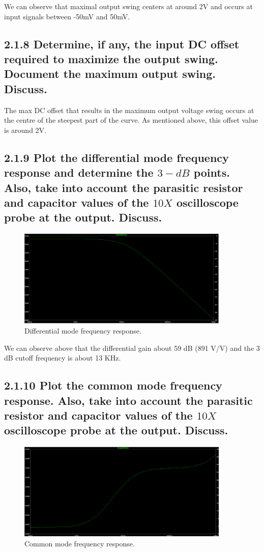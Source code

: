 \documentclass[12pt]{article}
\begin{document}
We can observe that maximal output swing centers at around 2V and occurs at input signals between -50mV and 50mV.

\subsection*{2.1.8 Determine, if any, the input DC offset required to maximize the output swing. Document the maximum output swing. Discuss.}

The max DC offset that results in the maximum output voltage swing occurs at the centre of the steepest part of the curve. As mentioned above, this offset value is around 2V.

\subsection*{2.1.9 Plot the differential mode frequency response and determine the $3-dB$ points. Also, take into account the parasitic resistor and capacitor values of the $10X$ oscilloscope probe at the output. Discuss.  }

\begin{figure}[H]
\centering
\includegraphics[width=0.9\textwidth]{Screenshots/Graph219_freq_res.png}
\caption{\label{fig:time-domain} Differential mode frequency response.}
\end{figure}

We can observe above that the differential gain about 59 dB (891 V/V) and the 3 dB cutoff frequency is about 13 KHz.

\subsection*{2.1.10 Plot the common mode frequency response. Also, take into account the parasitic resistor and capacitor values of the $10X$ oscilloscope probe at the output. Discuss. }

\begin{figure}[H]
\centering
\includegraphics[width=0.9\textwidth]{Screenshots/Graph_2110.png}
\caption{\label{fig:time-domain} Common mode frequency response.}
\end{figure}
\end{document}
